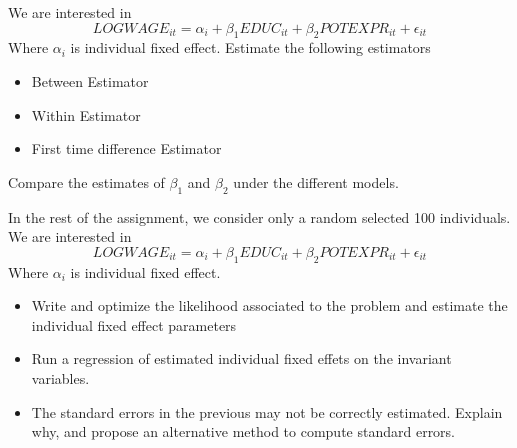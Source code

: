 \documentclass[10pt,a4paper]{article}
\newcommand{\1}{\mathds{1}}
\begin{document}
\begin{Exercise}[title=Fixed Effects Model]
We are interested in
\begin{equation}
 LOGWAGE_{it} = \alpha_i + \beta_1 EDUC_{it} + \beta_2 POTEXPR_{it} + \epsilon_{it} 
\end{equation}
Where $\alpha_i$ is individual fixed effect. Estimate the following estimators
\begin{itemize}
 \item Between Estimator
 \item Within Estimator
 \item First time difference Estimator
\end{itemize}
Compare the estimates of $\beta_1$ and $\beta_2$ under the different models.
\end{Exercise}

\begin{Exercise}[title=Understanding Fixed Effects]
In the rest of the assignment, we consider only a random selected 100 individuals. We are interested in
\begin{equation}
 LOGWAGE_{it} = \alpha_i + \beta_1 EDUC_{it} + \beta_2 POTEXPR_{it} + \epsilon_{it} 
\end{equation}
Where $\alpha_i$ is individual fixed effect.
\begin{itemize}
 \item Write and optimize the likelihood associated to the problem and estimate the individual fixed effect parameters
 \item Run a regression of estimated individual fixed effets on the invariant variables.
 \item The standard errors in the previous may not be correctly estimated. Explain why, and propose an alternative method to compute standard errors.
\end{itemize}
\end{Exercise}
\end{document}

